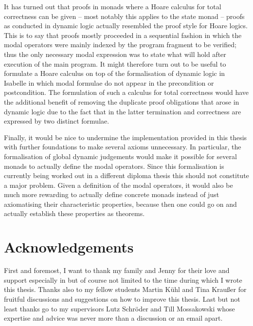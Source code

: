 It has turned out that proofs in monads where a Hoare calculus for total
correctness can be given -- most notably this applies to the state monad --
proofs as conducted in dynamic logic actually resembled the proof style for
Hoare logics. This is to say that proofs mostly proceeded in a sequential
fashion in which the modal operators were mainly indexed by the program fragment
to be verified; thus the only necessary modal expression was to state what will
hold after execution of the main program. It might therefore turn out to be
useful to formulate a Hoare calculus on top of the formalisation of dynamic
logic in Isabelle in which modal formulae do not appear in the precondition or
postcondition. The formulation of such a calculus for total correctness would
have the additional benefit of removing the duplicate proof obligations that
arose in dynamic logic due to the fact that in the latter termination and
correctness are expressed by two distinct formulae.

Finally, it would be nice to undermine the implementation provided in this
thesis with further foundations to make several axioms unnecessary. In
particular, the formalisation of global dynamic judgements would make it
possible for several monads to actually define the modal operators. Since this
formalisation is currently being worked out in a different diploma thesis this
should not constitute a major problem. Given a definition of the modal
operators, it would also be much more rewarding to actually define concrete
monads instead of just axiomatising their characteristic properties, because
then one could go on and actually establish these properties as theorems.

\section*{Acknowledgements}
First and foremost, I want to thank my family and Jenny for their love and
support especially in but of course not limited to the time during which I wrote
this thesis. Thanks also to my fellow students Martin K\"uhl and Tina Krau\ss er for
fruitful discussions and suggestions on how to improve this thesis.  Last but
not least thanks go to my supervisors Lutz Schr\"oder and Till Mossakowski whose
expertise and advice was never more than a discussion or an email apart.



